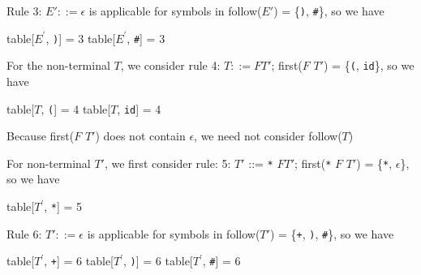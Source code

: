 \documentclass[8pt,a4paper,compress]{beamer}
\newcommand{\mm}[1]{$#1$}
\newcommand{\expo}[2]{$#1^{#2}$}
\newenvironment{spaced}
{
\smallskip
\hspace{.5cm}
\begin{minipage}[c]{\textwidth}
}
{
\end{minipage}
\smallskip
}
\begin{document}
\begin{frame}[fragile]
\pause

Rule 3: $E' ::= \epsilon$ is applicable for symbols in follow($E'$) =  \{\lstinline{)}, \lstinline{#}\}, so we have

\text{ }
\begin{spaced}
\begin{production}
table[\expo{E}{\prime}, \lstinline{)}] = 3
table[\expo{E}{\prime}, \lstinline{#}] = 3
\end{production}
\end{spaced}

\pause

For the non-terminal $T$, we consider rule 4: $T  ::= F T'$; first($F$ $T'$) = \{\lstinline{(}, \lstinline{id}\}, so we have

\text{ }
\begin{spaced}
\begin{production}
table[\mm{T}, \lstinline{(}] = 4
table[\mm{T}, \lstinline{id}] = 4
\end{production}
\end{spaced}

\pause

Because first($F$ $T'$) does not contain $\epsilon$, we need not consider follow($T$)

\pause
\bigskip

For non-terminal $T'$, we first consider rule: 5: $T'$ ::= \lstinline{*} $F T'$; first(\lstinline{*} $F$ $T'$) = \{\lstinline{*}, $\epsilon$\}, so we have

\text{ }
\begin{spaced}
\begin{production}
table[\expo{T}{\prime}, \lstinline{*}] = 5
\end{production}
\end{spaced}

\pause

Rule 6: $T' ::= \epsilon$ is applicable for symbols in follow($T'$) = \{\lstinline{+}, \lstinline{)}, \lstinline{#}\}, so we have

\text{ }
\begin{spaced}
\begin{production}
table[\expo{T}{\prime}, \lstinline{+}] = 6
table[\expo{T}{\prime}, \lstinline{)}] = 6
table[\expo{T}{\prime}, \lstinline{#}] = 6
\end{production}
\end{spaced}
\end{frame}
\end{document}
